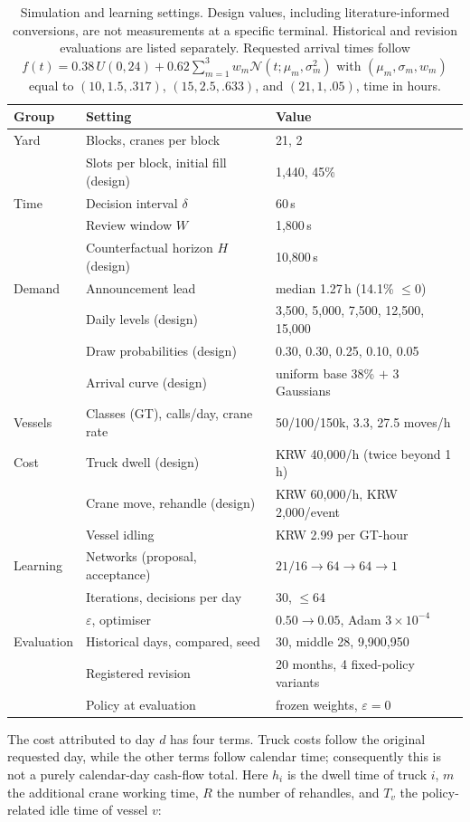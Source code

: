\documentclass[a4paper]{llncs}
\begin{document}
\begin{table}[bp]
\centering
\caption{Simulation and learning settings. Design values, including
literature-informed conversions, are not measurements at a specific
terminal. Historical and revision evaluations are listed separately.
Requested arrival times follow
$f(t)=0.38\,U(0,24)+0.62\sum_{m=1}^{3}w_m\mathcal N(t;\mu_m,\sigma_m^2)$
with $(\mu_m,\sigma_m,w_m)$ equal to $(10,1.5,.317)$, $(15,2.5,.633)$,
and $(21,1,.05)$, time in hours.}
\label{tab:setup}
\small
\setlength{\tabcolsep}{4pt}
\begin{tabular}{@{}l l@{\hspace{0.9em}} l@{}}
\toprule
Group & Setting & Value \\
\midrule
Yard & Blocks, cranes per block & 21, 2 \\
 & Slots per block, initial fill (design) & 1{,}440, 45\% \\
\midrule
Time & Decision interval $\delta$ & 60\,s \\
 & Review window $W$ & 1{,}800\,s \\
 & Counterfactual horizon $H$ (design) & 10{,}800\,s \\
\midrule
Demand & Announcement lead & median 1.27\,h (14.1\% $\le0$) \\
 & Daily levels (design) & 3{,}500, 5{,}000, 7{,}500, 12{,}500, 15{,}000 \\
 & Draw probabilities (design) & 0.30, 0.30, 0.25, 0.10, 0.05 \\
 & Arrival curve (design) & uniform base 38\% $+$ 3 Gaussians \\
\midrule
Vessels & Classes (GT), calls/day, crane rate & 50/100/150k, 3.3, 27.5 moves/h \\
\midrule
Cost & Truck dwell (design) & KRW 40{,}000/h (twice beyond 1\,h) \\
 & Crane move, rehandle (design) & KRW 60{,}000/h, KRW 2{,}000/event \\
 & Vessel idling & KRW 2.99 per GT-hour~\cite{ref25} \\
\midrule
Learning & Networks (proposal, acceptance) & $21/16\!\to\!64\!\to\!64\!\to\!1$ \\
 & Iterations, decisions per day & 30, $\le64$ \\
 & $\varepsilon$, optimiser & $0.50\!\to\!0.05$, Adam $3\times10^{-4}$ \\
\midrule
Evaluation & Historical days, compared, seed & 30, middle 28, 9{,}900{,}950 \\
 & Registered revision & 20 months, 4 fixed-policy variants \\
 & Policy at evaluation & frozen weights, $\varepsilon=0$ \\
\bottomrule
\end{tabular}
\end{table}
The cost attributed to day $d$ has four terms. Truck costs follow
the original requested day, while the other terms follow calendar
time; consequently this is not a purely calendar-day cash-flow total.
Here $h_i$ is
the dwell time of truck $i$, $m$ the additional crane working time, $R$
the number of rehandles, and $T_v$ the policy-related idle time of
vessel $v$:
\end{document}

